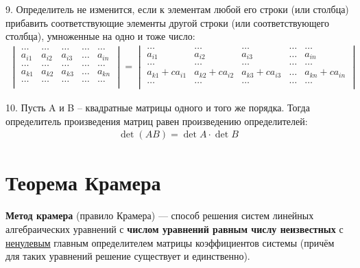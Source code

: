 \documentclass[a4paper,12pt,oneside]{extbook}
\theoremstyle{numbered}
\theoremstyle{unnumbered}
\theoremstyle{named}
\theoremstyle{unnumbered}
\theoremstyle{named}
\theoremstyle{named}
\theoremstyle{named}
\begin{document}
9. Определитель не изменится, если к элементам любой его строки (или столбца) прибавить соответствующие элементы другой строки (или соответствующего столбца), умноженные на одно и тоже число:
\begin{gather*}
    \begin{vmatrix}
        \dots  & \dots  & \dots  & \dots & \dots  \\
        a_{i1} & a_{i2} & a_{i3} & \dots & a_{in} \\
        \dots  & \dots  & \dots  & \dots & \dots  \\
        a_{k1} & a_{k2} & a_{k3} & \dots & a_{kn} \\
        \dots  & \dots  & \dots  & \dots & \dots  \\
    \end{vmatrix}
    =
    \begin{vmatrix}
        \dots            & \dots            & \dots            & \dots & \dots            \\
        a_{i1}           & a_{i2}           & a_{i3}           & \dots & a_{in}           \\
        \dots            & \dots            & \dots            & \dots & \dots            \\
        a_{k1} + ca_{i1} & a_{k2} + ca_{i2} & a_{k3} + ca_{i3} & \dots & a_{kn} + ca_{in} \\
        \dots            & \dots            & \dots            & \dots & \dots            \\
    \end{vmatrix}
\end{gather*}

10. Пусть A и B – квадратные матрицы одного и того же порядка. Тогда определитель произведения матриц равен произведению определителей:
\begin{gather*}
    \det (AB) = \det A \cdot \det B
\end{gather*}

\section{Теорема Крамера}%
\label{sec:Теорема Крамера}

\textbf{Метод крамера} (правило Крамера) — способ решения систем линейных алгебраических уравнений с \textbf{числом уравнений равным числу неизвестных} с \underline{ненулевым} главным определителем матрицы коэффициентов системы (причём для таких уравнений решение существует и единственно).
\end{document}
